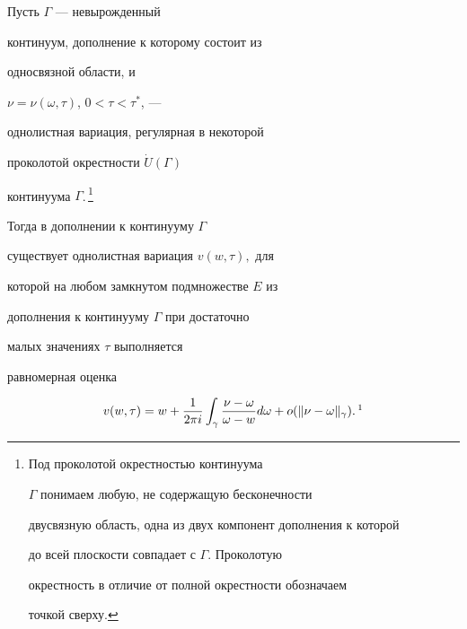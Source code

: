 \begin{thm}


Пусть $\Gamma$ --- невырожденный


континуум, дополнение к которому состоит из 


односвязной области, и


$\nu=\nu(\omega,\tau)$, $0<\tau<\tau^{*}$, ---


однолистная вариация, регулярная в некоторой


проколотой окрестности $\Dot{U}(\Gamma)$


континуума $\Gamma$.\,\footnote{Под проколотой окрестностью континуума


$\Gamma$ понимаем любую, не содержащую бесконечности


двусвязную область, одна из двух компонент дополнения к которой 


до всей плоскости совпадает с $\Gamma$. Проколотую


окрестность в отличие от полной окрестности обозначаем 


точкой сверху.}





Тогда в дополнении к континууму $\Gamma$


существует однолистная вариация $v(w,\tau),$ для


которой на любом замкнутом подмножестве $E$ из


дополнения к континууму $\Gamma$ при достаточно


малых значениях $\tau$ выполняется


равномерная оценка


\begin{equation}


v(w,\tau)=w+


\frac{1}{2\pi i}\int_{\gamma}\frac{\nu-\omega}


{\omega-w}d\omega


+o(\|\nu-\omega\|_{\gamma}).\,\footnotemark


\end{equation}








\end{thm}
